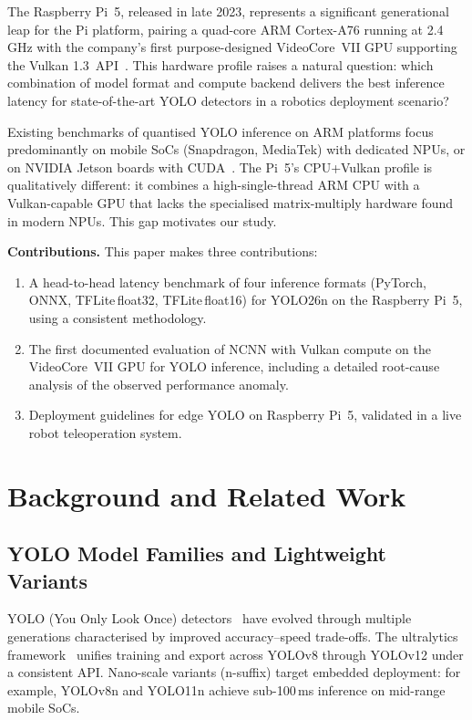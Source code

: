\documentclass[conference]{IEEEtran}
\begin{document}
The Raspberry Pi~5, released in late 2023, represents a significant generational
leap for the Pi platform, pairing a quad-core ARM Cortex-A76 running at 2.4\,GHz
with the company's first purpose-designed VideoCore~VII GPU supporting the Vulkan
1.3~API~\cite{rpif2023pi5}. This hardware profile raises a natural question: which
combination of model format and compute backend delivers the best inference latency
for state-of-the-art YOLO detectors in a robotics deployment scenario?

Existing benchmarks of quantised YOLO inference on ARM platforms
focus predominantly on mobile SoCs (Snapdragon, MediaTek) with dedicated NPUs, or
on NVIDIA Jetson boards with CUDA~\cite{chen2023yoloarm,li2024tflite}. The
Pi~5's CPU+Vulkan profile is qualitatively different: it combines a high-single-thread
ARM CPU with a Vulkan-capable GPU that lacks the specialised matrix-multiply
hardware found in modern NPUs. This gap motivates our study.

\textbf{Contributions.} This paper makes three contributions:
\begin{enumerate}
  \item A head-to-head latency benchmark of four inference formats
        (PyTorch, ONNX, TFLite\,float32, TFLite\,float16) for YOLO26n
        on the Raspberry Pi~5, using a consistent methodology.
  \item The first documented evaluation of NCNN with Vulkan compute on
        the VideoCore~VII GPU for YOLO inference, including a detailed
        root-cause analysis of the observed performance anomaly.
  \item Deployment guidelines for edge YOLO on Raspberry Pi~5,
        validated in a live robot teleoperation system.
\end{enumerate}

\section{Background and Related Work}

\subsection{YOLO Model Families and Lightweight Variants}

YOLO (You Only Look Once) detectors~\cite{redmon2016yolo} have evolved through
multiple generations characterised by improved accuracy–speed trade-offs. The
ultralytics framework~\cite{ultralytics2023} unifies training and export across
YOLOv8 through YOLOv12 under a consistent API. Nano-scale variants (n-suffix)
target embedded deployment: for example, YOLOv8n and YOLO11n achieve
sub-100\,ms inference on mid-range mobile SoCs.
\end{document}
